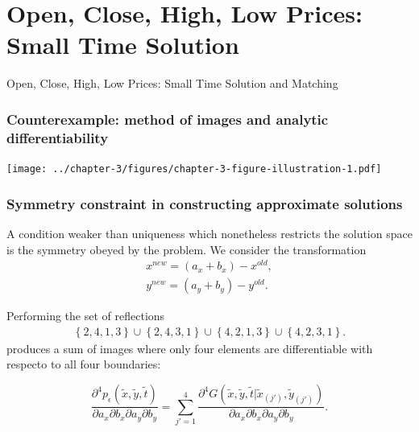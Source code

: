 \documentclass{beamer}
\begin{document}
\section{Open, Close, High, Low Prices: Small Time Solution}
\begin{frame}
Open, Close, High, Low Prices: Small Time Solution and Matching
\end{frame}
\begin{frame}
  \frametitle{Counterexample: method of images and analytic differentiability}
  \centering
  \texttt{[image: ../chapter-3/figures/chapter-3-figure-illustration-1.pdf]}
\end{frame}
\begin{frame}
  \frametitle{Symmetry constraint in constructing approximate solutions}

  A condition weaker than uniqueness which nonetheless restricts the
solution space is the symmetry obeyed by the problem. We consider the transformation
\begin{align*}
  x^{new} = (a_x + b_x) - x^{old}, \\
  y^{new} = (a_y + b_y) - y^{old}.
\end{align*}

Performing the set of reflections
\begin{align*}
  \left\{ 2,4,1,3 \right\} \cup \left\{ 2,4,3,1 \right\} \cup \left\{ 4,2,1,3 \right\} \cup \left\{ 4,2,3,1 \right\}. 
\end{align*}
produces a sum of images where only four elements are differentiable
with respecto to all four boundaries:

\[
  \frac{\partial^4 p_\epsilon(\tilde{x}, \tilde{y}, \tilde{t})}{\partial a_x \partial b_x \partial a_y \partial b_y}  = \sum_{j'=1}^{4}
                                                                                                                        \frac{\partial^4G(\tilde{x},\tilde{y},\tilde{t}|\tilde{x}_{(j')},\tilde{y}_{(j')})}{\partial a_x \partial b_x \partial a_y \partial b_y}.
\]

\end{frame}
\end{document}
